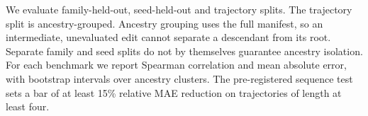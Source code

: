 We evaluate family-held-out, seed-held-out and trajectory splits. The trajectory split is ancestry-grouped. Ancestry grouping uses the full manifest, so an intermediate, unevaluated edit cannot separate a descendant from its root. Separate family and seed splits do not by themselves guarantee ancestry isolation. For each benchmark we report Spearman correlation and mean absolute error, with bootstrap intervals over ancestry clusters. The pre-registered sequence test sets a bar of at least 15\% relative MAE reduction on trajectories of length at least four.

